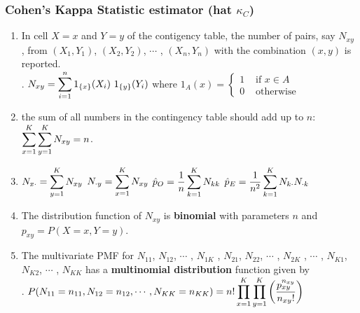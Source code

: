 \subsubsection{Cohen’s Kappa Statistic estimator (hat $\kappa_C$)}

\begin{enumerate}
    \item In cell $X = x$ and $Y = y$ of the contigency table, the number of pairs, say $N_{x y}$ , from $(X_1, Y_1)$, $(X_2, Y_2)$, $\cdots$ , $(X_n , Y_n )$ with the combination $(x, y)$ is reported. 
    \hfill \cite{statistics/book/Statistics-for-Data-Scientists/Maurits-Kaptein}
    \\
    .\hfill
    $
        N_{x y} = \displaystyle\sum^n_{i=1} 1_{\left\{x\right\}}(X_i )\ 1_{\left\{y\right\}}(Y_i )
    $
    \hfill
    where 
    $
        1_A(x) = 
        \begin{cases}
            1 & \text{ if } x \in A \\
            0 & \text{ otherwise}
        \end{cases}
    $
    \hfill \cite{statistics/book/Statistics-for-Data-Scientists/Maurits-Kaptein}

    \item  the sum of all numbers in the contingency table should add up to $n$: $\displaystyle\sum^K_{x=1} \displaystyle\sum^K_{y=1} N_{x y} = n$.
    \hfill \cite{statistics/book/Statistics-for-Data-Scientists/Maurits-Kaptein}

    \item 
    $N_{x\cdot} = \displaystyle\sum^K_{y=1} N_{x y}$ 
    \hfill
    $N_{\cdot y} = \displaystyle\sum^K_{x=1} N_{x y}$
    \hfill
    $\hat{p}_O = \dfrac{1}{ n} \displaystyle\sum^K_{k=1} N_{kk} $
    \hfill
    $\hat{p}_E = \dfrac{1}{ n^2} \displaystyle\sum^K_{k=1} N_{k\cdot}N_{\cdot k} $
    \hfill \cite{statistics/book/Statistics-for-Data-Scientists/Maurits-Kaptein}

    \item The distribution function of $N_{x y}$ is \textbf{binomial} with parameters $n$ and $p_{x y} = P(X = x, Y = y)$.
    \hfill \cite{statistics/book/Statistics-for-Data-Scientists/Maurits-Kaptein}

    \item The multivariate PMF for $N_{11}$, $N_{12}$, $\cdots$ , $N_{1K}$ , $N_{21}$, $N_{22}$, $\cdots$ , $N_{2K}$ , $\cdots$ , $N_{K 1}$, $N_{K 2}$, $\cdots$ , $N_{K K}$ has a \textbf{multinomial distribution} function given by
    \hfill \cite{statistics/book/Statistics-for-Data-Scientists/Maurits-Kaptein}
    \\
    .\hfill
    $
        P(N_{11} = n_{11}, N_{12} = n_{12}, \cdots , N_{K K} = n_{K K} ) 
        = n! \displaystyle\prod^K_{x=1} \displaystyle\prod^K_{y=1} \left(\dfrac{p^{n_{x y}}_{x y}}{n_{x y} !}\right)
    $
    \hfill \cite{statistics/book/Statistics-for-Data-Scientists/Maurits-Kaptein}


\end{enumerate}
